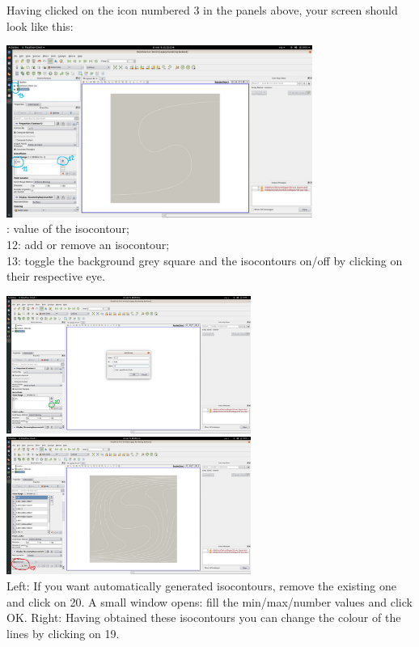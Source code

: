 Having clicked on the icon numbered 3 in the panels above, 
your screen should look like this:

\begin{center}
\includegraphics[width=10cm]{images/paraview/p7}\\
{: value of the isocontour; \\
12: add or remove an isocontour;\\
13: toggle the background grey square and the isocontours on/off by clicking on their respective eye.}
\end{center}


\begin{center}
\includegraphics[width=8cm]{images/paraview/p8}
\includegraphics[width=8cm]{images/paraview/p9}\\
{\captionfont Left: If you want automatically generated isocontours, 
remove the existing one and click on 20. A small window opens: 
fill the min/max/number values and click OK.
Right: Having obtained these isocontours you can change the colour of the lines 
by clicking on 19.}
\end{center}

